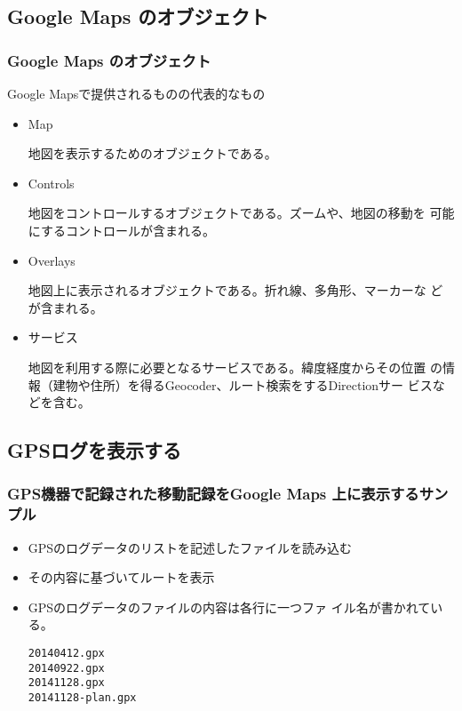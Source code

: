 \documentclass[dvipsk]{beamer}
\begin{document}
\subsection{Google Maps のオブジェクト}
\begin{frame}[containsverbatim]
\frametitle{Google Maps のオブジェクト}
Google Mapsで提供されるものの代表的なもの
\begin{itemize}
 \item Map

       地図を表示するためのオブジェクトである。
 \item Controls

       地図をコントロールするオブジェクトである。ズームや、地図の移動を
       可能にするコントロールが含まれる。
 \item Overlays

       地図上に表示されるオブジェクトである。折れ線、多角形、マーカーな
       どが含まれる。
 \item サービス

       地図を利用する際に必要となるサービスである。緯度経度からその位置
       の情報（建物や住所）を得るGeocoder、ルート検索をするDirectionサー
       ビスなどを含む。
\end{itemize}
\end{frame}
\subsection{GPSログを表示する}

\begin{frame}[containsverbatim]
\frametitle{GPS機器で記録された移動記録をGoogle Maps 上に表示するサンプル}
\begin{itemize}
 \item GPSのログデータのリストを記述したファイルを読み込む
 \item その内容に基づいてルートを表示
 \item GPSのログデータのファイルの内容は各行に一つファ
イル名が書かれている。
\begin{verbatim}
20140412.gpx
20140922.gpx
20141128.gpx
20141128-plan.gpx
\end{verbatim}
\end{itemize}
\end{frame}
\end{document}
